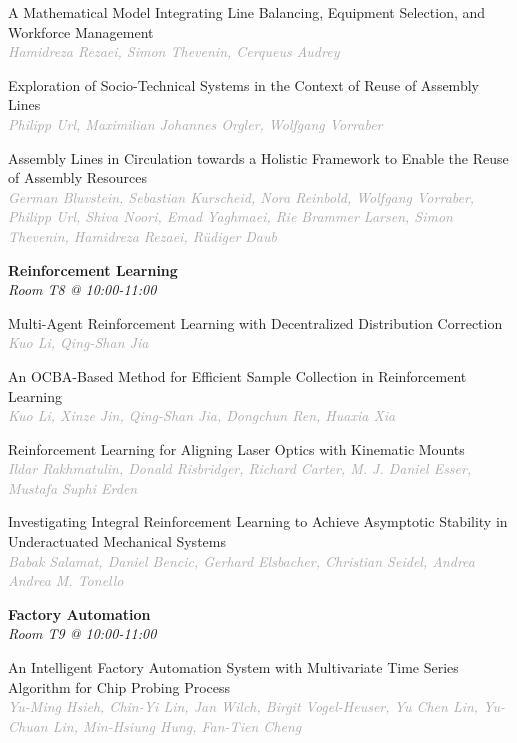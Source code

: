 \begin{multicols*}{2}
\small A Mathematical Model Integrating Line Balancing, Equipment Selection, and Workforce Management\\ 
\footnotesize \textcolor{darkgray}{\textit{Hamidreza Rezaei, Simon  Thevenin, Cerqueus  Audrey}}

\small Exploration of Socio-Technical Systems in the Context of Reuse of Assembly Lines\\ 
\footnotesize \textcolor{darkgray}{\textit{Philipp Url, Maximilian Johannes  Orgler, Wolfgang  Vorraber}}

\small Assembly Lines in Circulation towards a Holistic Framework to Enable the Reuse of Assembly Resources\\ 
\footnotesize \textcolor{darkgray}{\textit{German Bluvstein, Sebastian  Kurscheid, Nora  Reinbold, Wolfgang  Vorraber, Philipp  Url, Shiva  Noori, Emad  Yaghmaei, Rie Brammer  Larsen, Simon  Thevenin, Hamidreza  Rezaei, Rüdiger  Daub}}

\normalsize \textbf{Reinforcement Learning}\\
\small \textit{Room T8 @ 10:00-11:00}

\small Multi-Agent Reinforcement Learning with Decentralized Distribution Correction\\ 
\footnotesize \textcolor{darkgray}{\textit{Kuo Li, Qing-Shan  Jia}}

\small An OCBA-Based Method for Efficient Sample Collection in Reinforcement Learning\\ 
\footnotesize \textcolor{darkgray}{\textit{Kuo Li, Xinze  Jin, Qing-Shan  Jia, Dongchun  Ren, Huaxia  Xia}}

\small Reinforcement Learning for Aligning Laser Optics with Kinematic Mounts\\ 
\footnotesize \textcolor{darkgray}{\textit{Ildar Rakhmatulin, Donald  Risbridger, Richard  Carter, M. J. Daniel  Esser, Mustafa Suphi  Erden}}

\small Investigating Integral Reinforcement Learning to Achieve Asymptotic Stability in Underactuated Mechanical Systems\\ 
\footnotesize \textcolor{darkgray}{\textit{Babak Salamat, Daniel  Bencic, Gerhard  Elsbacher, Christian  Seidel, Andrea  Andrea M. Tonello}}

\normalsize \textbf{Factory Automation}\\
\small \textit{Room T9 @ 10:00-11:00}

\small An Intelligent Factory Automation System with Multivariate Time Series Algorithm for Chip Probing Process\\ 
\footnotesize \textcolor{darkgray}{\textit{Yu-Ming Hsieh, Chin-Yi  Lin, Jan  Wilch, Birgit  Vogel-Heuser, Yu Chen  Lin, Yu-Chuan  Lin, Min-Hsiung  Hung, Fan-Tien  Cheng}}


\end{multicols*}
